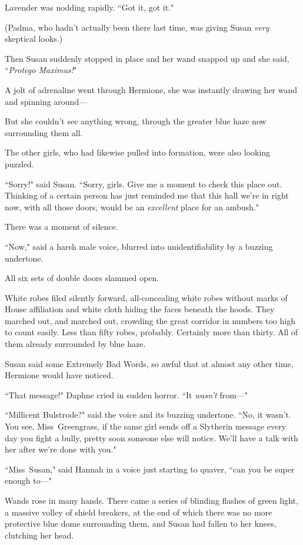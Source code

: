 Lavender was nodding rapidly. ``Got it, got it."

(Padma, who hadn't actually been there last time, was giving Susan \emph{very} skeptical looks.)

Then Susan suddenly stopped in place and her wand snapped up and she said, ``\emph{Protego Maximus!}"

A jolt of adrenaline went through Hermione, she was instantly drawing her wand and spinning around—

But she couldn't see anything wrong, through the greater blue haze now surrounding them all.

The other girls, who had likewise pulled into formation, were also looking puzzled.

``Sorry!" said Susan. ``Sorry, girls. Give me a moment to check this place out. Thinking of a certain person has just reminded me that this hall we're in right now, with all those doors, would be an \emph{excellent} place for an ambush."

There was a moment of silence.

``Now," said a harsh male voice, blurred into unidentifiability by a buzzing undertone.

All six sets of double doors slammed open.

White robes filed silently forward, all-concealing white robes without marks of House affiliation and white cloth hiding the faces beneath the hoods. They marched out, and marched out, crowding the great corridor in numbers too high to count easily. Less than fifty robes, probably. Certainly more than thirty. All of them already surrounded by blue haze.

Susan said some Extremely Bad Words, so awful that at almost any other time, Hermione would have noticed.

``That message!" Daphne cried in sudden horror. ``It \emph{wasn't} from—"

``Millicent Bulstrode?" said the voice and its buzzing undertone. ``No, it wasn't. You see, Miss~Greengrass, if the same girl sends off a Slytherin message every day you fight a bully, pretty soon someone else will notice. We'll have a talk with her after we're done with you."

``Miss~Susan," said Hannah in a voice just starting to quaver, ``can you be super enough to—"

Wands rose in many hands. There came a series of blinding flashes of green light, a massive volley of shield breakers, at the end of which there was no more protective blue dome surrounding them, and Susan had fallen to her knees, clutching her head.

